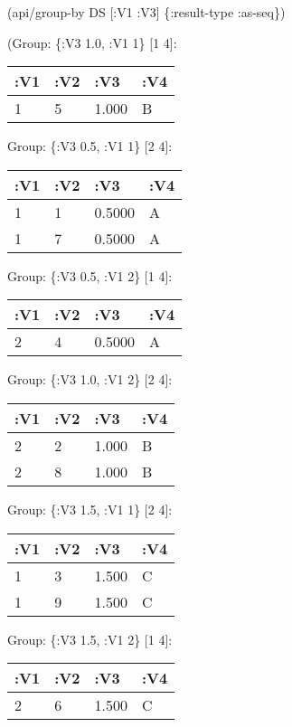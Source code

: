 \documentclass[]{article}
\newenvironment{Shaded}{\begin{snugshade}}{\end{snugshade}}
\newcommand{\AttributeTok}[1]{\textcolor[rgb]{0.77,0.63,0.00}{#1}}
\newcommand{\NormalTok}[1]{#1}
\begin{document}
\begin{Shaded}
\begin{Highlighting}[]
\NormalTok{(api/group-by DS [}\AttributeTok{:V1} \AttributeTok{:V3}\NormalTok{] \{}\AttributeTok{:result-type} \AttributeTok{:as-seq}\NormalTok{\})}
\end{Highlighting}
\end{Shaded}

(Group: \{:V3 1.0, :V1 1\} {[}1 4{]}:

\begin{longtable}[]{@{}llll@{}}
\toprule
:V1 & :V2 & :V3 & :V4\tabularnewline
\midrule
\endhead
1 & 5 & 1.000 & B\tabularnewline
\bottomrule
\end{longtable}

Group: \{:V3 0.5, :V1 1\} {[}2 4{]}:

\begin{longtable}[]{@{}llll@{}}
\toprule
:V1 & :V2 & :V3 & :V4\tabularnewline
\midrule
\endhead
1 & 1 & 0.5000 & A\tabularnewline
1 & 7 & 0.5000 & A\tabularnewline
\bottomrule
\end{longtable}

Group: \{:V3 0.5, :V1 2\} {[}1 4{]}:

\begin{longtable}[]{@{}llll@{}}
\toprule
:V1 & :V2 & :V3 & :V4\tabularnewline
\midrule
\endhead
2 & 4 & 0.5000 & A\tabularnewline
\bottomrule
\end{longtable}

Group: \{:V3 1.0, :V1 2\} {[}2 4{]}:

\begin{longtable}[]{@{}llll@{}}
\toprule
:V1 & :V2 & :V3 & :V4\tabularnewline
\midrule
\endhead
2 & 2 & 1.000 & B\tabularnewline
2 & 8 & 1.000 & B\tabularnewline
\bottomrule
\end{longtable}

Group: \{:V3 1.5, :V1 1\} {[}2 4{]}:

\begin{longtable}[]{@{}llll@{}}
\toprule
:V1 & :V2 & :V3 & :V4\tabularnewline
\midrule
\endhead
1 & 3 & 1.500 & C\tabularnewline
1 & 9 & 1.500 & C\tabularnewline
\bottomrule
\end{longtable}

Group: \{:V3 1.5, :V1 2\} {[}1 4{]}:

\begin{longtable}[]{@{}llll@{}}
\toprule
:V1 & :V2 & :V3 & :V4\tabularnewline
\midrule
\endhead
2 & 6 & 1.500 & C\tabularnewline
\bottomrule
\end{longtable}
\end{document}
